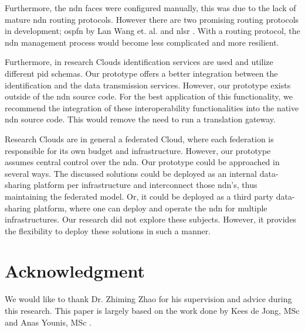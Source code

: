 \documentclass[conference]{IEEEtran}
\begin{document}
Furthermore, the \gls{ndn} faces were configured manually, this was due to the lack of mature \gls{ndn} routing protocols. However there are two promising routing protocols in development; \gls{ospfn} by Lan Wang et. al. \cite{ndn-ospfn2} and \gls{nlsr} \cite{nlsr}. With a routing protocol, the \gls{ndn} management process would become less complicated and more resilient.

Furthermore, in research Clouds identification services are used and utilize different \gls{pid} schemas. Our prototype offers a better integration between the identification and the data transmission services. However, our prototype exists outside of the \gls{ndn} source code. For the best application of this functionality, we recommend the integration of these interoperability functionalities into the native \gls{ndn} source code. This would remove the need to run a translation gateway.

Research Clouds are in general a federated Cloud, where each federation is responsible for its own budget and infrastructure. However, our prototype assumes central control over the \gls{ndn}. Our prototype could be approached in several ways. The discussed solutions could be deployed as an internal data-sharing platform per infrastructure and interconnect those \gls{ndn}'s, thus maintaining the federated model. Or, it could be deployed as a third party data-sharing platform, where one can deploy and operate the \gls{ndn} for multiple infrastructures. Our research did not explore these subjects. However, it provides the flexibility to deploy these solutions in such a manner.

\section*{Acknowledgment}
We would like to thank Dr. Zhiming Zhao for his supervision and advice during this research. This paper is largely based on the work done by Kees de Jong, MSc and Anas Younis, MSc \cite{de2019planning}.
\end{document}
